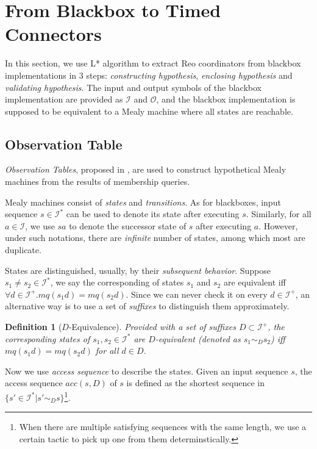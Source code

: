 \documentclass[conference, a4paper]{IEEEtran}
\newtheorem{definition}{Definition}
\begin{document}
\section{From Blackbox to Timed Connectors} 
\label{sec:activelearning}
In this section, we use L* algorithm to extract Reo coordinators from blackbox
implementations in 3 steps:
\emph{constructing hypothesis}, \emph{enclosing hypothesis} and \emph{validating hypothesis}. 
The input and output symbols of the blackbox implementation are provided as $\mathcal{I}$ and
$\mathcal{O}$, and the blackbox implementation is supposed to be equivalent to a Mealy machine where
all states are reachable.

\subsection{Observation Table}
\emph{Observation Tables}, proposed in \cite{DBLP:journals/iandc/Angluin87}, are used to construct
hypothetical Mealy machines from the results of membership queries.

Mealy machines consist of \emph{states} and \emph{transitions}.
As for blackboxes, input sequence $s\in\mathcal{I}^*$ can be used to denote its state 
after executing $s$. Similarly, for all $a\in\mathcal{I}$, we use $sa$ to denote the successor
state of $s$ after executing $a$.
However, under such notations, there are \emph{infinite} number of states, among which most are
duplicate.

States are distinguished, usually, by their \emph{subsequent behavior}. Suppose $s_1\neq s_2\in
\mathcal{I}^*$, we say the corresponding of states $s_1$ and $s_2$ are equivalent iff $\forall d\in
\mathcal{I}^+. mq(s_1d)=mq(s_2d)$. Since we can never check it on every $d\in\mathcal{I}^+$, an
alternative way is to use a set of \emph{suffixes} to distinguish them approximately.
\begin{definition}[$D$-Equivalence]
  Provided with a set of suffixes $D\subset\mathcal{I}^+$, the corresponding states of
  $s_1,s_2\in\mathcal{I}^*$ are $D$-equivalent (denoted as $s_1\sim_D s_2$)
  iff $mq(s_1d) = mq(s_2d)$ for all $d\in D$.
\end{definition}

Now we use \emph{access sequence} to describe the states. Given an input sequence $s$, the access
sequence $acc(s,D)$ of $s$ is defined as the shortest sequence in $\{s'\in\mathcal{I}^*|s'\sim_D
s\}$\footnote{When there are multiple satisfying sequences with the same length, we use a certain tactic
to pick up one from them determinstically.}.
\end{document}
